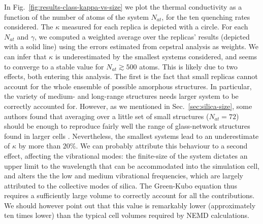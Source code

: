 In Fig.~\ref{fig:results-class-kappa-vs-size} we plot the thermal conductivity as a function of the number of atoms of the system $N_{at}$, for the ten quenching rates considered. 
The $\kappa$ measured for each replica is depicted with a circle. 
For each $N_{at}$ and $\gamma$, we computed a weighted average over the replicas' results (depicted with a solid line) using the errors estimated from cepstral analysis as weights. 
We can infer that $\kappa$ is underestimated by the smallest systems considered, and seems to converge to a stable value for $N_{at}\gtrsim 500$ atoms. 
This is likely due to two effects, both entering this analysis. 
The first is the fact that small replicas cannot account for the whole ensemble of possible amorphous structures. In particular, the variety of medium- and long-range structures needs larger system to be correctly accounted for. However, as we mentioned in Sec.~\ref{sec:silica-size}, some authors found that averaging over a little set of small structures ($N_{at}=72$) should be enough to reproduce fairly well the range of glass-network structures found in larger cells \cite{VanGinhoven2005}. 
Nevertheless, the smallest systems lead to an underestimate of $\kappa$ by more than $20\%$. We can probably attribute this behaviour to a second effect, affecting the vibrational modes: the finite-size of the system dictates an upper limit to the wavelength that can be accommodated into the simulation cell, and alters the the low and medium vibrational frequencies, which are largely attributed to the collective modes of silica. The Green-Kubo equation thus requires a sufficiently large volume to correctly account for all the contributions. 
We should however point out that this value is remarkably lower (approximately ten times lower) than the typical cell volumes required by NEMD calculations.

